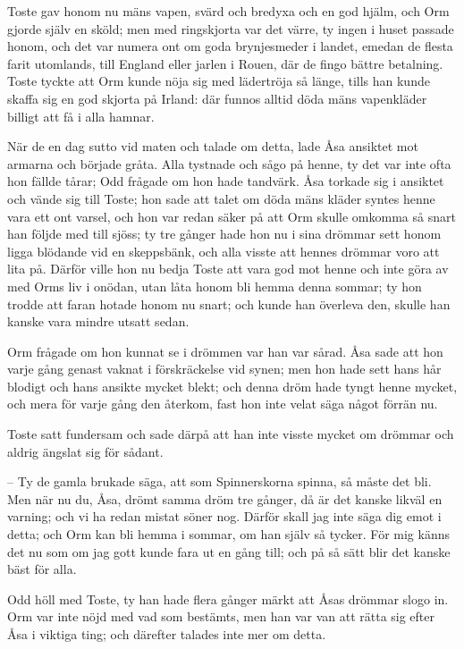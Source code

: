 \initial Toste gav honom nu mäns vapen, svärd och bredyxa och en god hjälm, och Orm gjorde själv en sköld; men med ringskjorta var det värre, ty ingen i huset passade honom, och det var numera ont om goda brynjesmeder i landet, emedan de flesta farit utomlands, till England eller jarlen i Rouen, där de fingo bättre betalning. Toste tyckte att Orm kunde nöja sig med lädertröja så länge, tills han kunde skaffa sig en god skjorta på Irland: där funnos alltid döda mäns vapenkläder billigt att få i alla hamnar.

\initial När de en dag sutto vid maten och talade om detta, lade Åsa ansiktet mot armarna och började gråta. Alla tystnade och sågo på henne, ty det var inte ofta hon fällde tårar; Odd frågade om hon hade tandvärk. Åsa torkade sig i ansiktet och vände sig till Toste; hon sade att talet om döda mäns kläder syntes henne vara ett ont varsel, och hon var redan säker på att Orm skulle omkomma så snart han följde med till sjöss; ty tre gånger hade hon nu i sina drömmar sett honom ligga blödande vid en skeppsbänk, och alla visste att hennes drömmar voro att lita på. Därför ville hon nu bedja Toste att vara god mot henne och inte göra av med Orms liv i onödan, utan låta honom bli hemma denna sommar; ty hon trodde att faran hotade honom nu snart; och kunde han överleva den, skulle han kanske vara mindre utsatt sedan.

\initial Orm frågade om hon kunnat se i drömmen var han var sårad. Åsa sade att hon varje gång genast vaknat i förskräckelse vid synen; men hon hade sett hans hår blodigt och hans ansikte mycket blekt; och denna dröm hade tyngt henne mycket, och mera för varje gång den återkom, fast hon inte velat säga något förrän nu.

\initial Toste satt fundersam och sade därpå att han inte visste mycket om drömmar och aldrig ängslat sig för sådant.

– Ty de gamla brukade säga, att som Spinnerskorna spinna, så måste det bli. Men när nu du, Åsa, drömt samma dröm tre gånger, då är det kanske likväl en varning; och vi ha redan mistat söner nog. Därför skall jag inte säga dig emot i detta; och Orm kan bli hemma i sommar, om han själv så tycker. För mig känns det nu som om jag gott kunde fara ut en gång till; och på så sätt blir det kanske bäst för alla.

\initial Odd höll med Toste, ty han hade flera gånger märkt att Åsas drömmar slogo in. Orm var inte nöjd med vad som bestämts, men han var van att rätta sig efter Åsa i viktiga ting; och därefter talades inte mer om detta.

